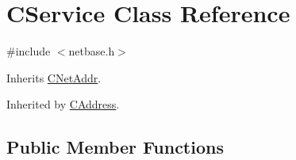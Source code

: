 \hypertarget{class_c_service}{}\section{C\+Service Class Reference}
\label{class_c_service}


{\ttfamily \#include $<$netbase.\+h$>$}



Inherits \mbox{\hyperlink{class_c_net_addr}{C\+Net\+Addr}}.



Inherited by \mbox{\hyperlink{class_c_address}{C\+Address}}.

\subsection*{Public Member Functions}
